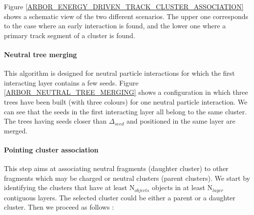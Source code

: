\documentclass[12pt]{article}
\begin{document}
Figure \ref{ARBOR_ENERGY_DRIVEN_TRACK_CLUSTER_ASSOCIATION} shows a schematic view of the two different scenarios. The upper one corresponds to the case where an early interaction is found, and the lower one where a primary track segment of a cluster is found.

\paragraph*{Neutral tree merging} This algorithm is designed for neutral particle interactions for which the first interacting layer contains a few seeds. Figure \ref{ARBOR_NEUTRAL_TREE_MERGING} shows a configuration in which three trees have been built (with three colours) for one neutral particle interaction. We can see that the seeds in the first interacting layer all belong to the same cluster. The trees having seeds closer than $\Delta_{seed}$ and positioned in the same layer are merged.

\paragraph*{Pointing cluster association} This step aims at associating neutral fragments (daughter cluster) to other fragments which may be charged or neutral clusters (parent clusters). We start by identifying the clusters that have at least N$_{objects}$ objects in at least N$_{layer}$ contiguous layers. The selected cluster could be either a parent or a daughter cluster. Then we proceed as follows :
\end{document}
